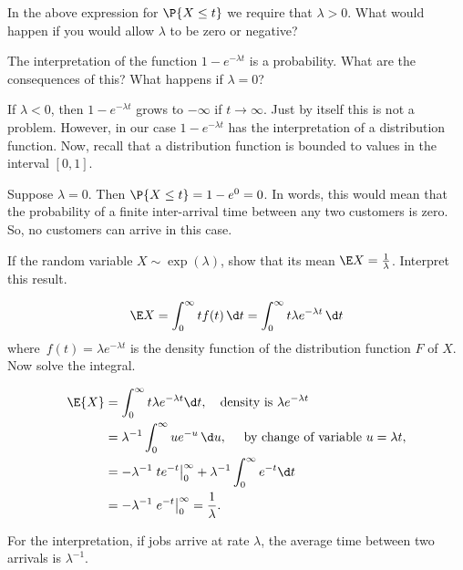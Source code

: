 \begin{exercise} 
In the above expression for $\P{X\leq t}$ we require that $\lambda>0$. What would happen if you would allow $\lambda$ to be zero or negative?
\begin{hint}
  The interpretation of the function $1-e^{-\lambda t}$ is a probability. What are the consequences of this? What happens if $\lambda=0$?
\end{hint}
\begin{solution}
  If $\lambda<0$, then $1-e^{-\lambda t}$ grows to $-\infty$ if $t\to \infty$. Just by itself this is not a problem. However, in our case $1-e^{-\lambda t}$ has the interpretation of a distribution function. Now, recall that a distribution function is bounded to values in the interval $[0,1]$.

Suppose $\lambda=0$. Then $\P{X\leq t} = 1-e^{0} = 0$. In words, this would mean that the probability of a finite inter-arrival time between any two customers is zero. So, no customers can arrive in this case. 
\end{solution}
\end{exercise}

\begin{exercise} \label{exer:lambda}
  If the random variable $X\sim\exp(\lambda)$, show that its mean $\E X = \frac{1}\lambda$. Interpret this result.
  \begin{hint}
 \begin{equation*}
    \E X = \int_0^\infty t f(t)\, \d t =
    \int_0^\infty t \lambda e^{-\lambda t}\, \d t 
  \end{equation*}
  where~$f(t)=\lambda e^{-\lambda t}$ is the density function of the distribution function $F$ of $X$. Now solve the integral.
  \end{hint}
  \begin{solution}
    \begin{align*}
\E{X} 
&= \int_0^\infty t \lambda e^{-\lambda t} \d t, \quad\text{density is } \lambda e^{-\lambda t} \\
&=   \lambda^{-1} \int_0^\infty u e^{-u}\, \d u, \quad \text{ by  change of variable $u=\lambda t$},   \\
&=  -\lambda^{-1}\left. t e^{- t}\right|_0^\infty + \lambda^{-1} \int_0^\infty e^{- t} \d t\\
&=  - \lambda^{-1} \left. e^{- t} \right|_0^\infty =  \frac1\lambda.
    \end{align*}

For the interpretation, if jobs arrive at rate $\lambda$, the average time between two arrivals is $\lambda^{-1}$.
  \end{solution}
\end{exercise}


